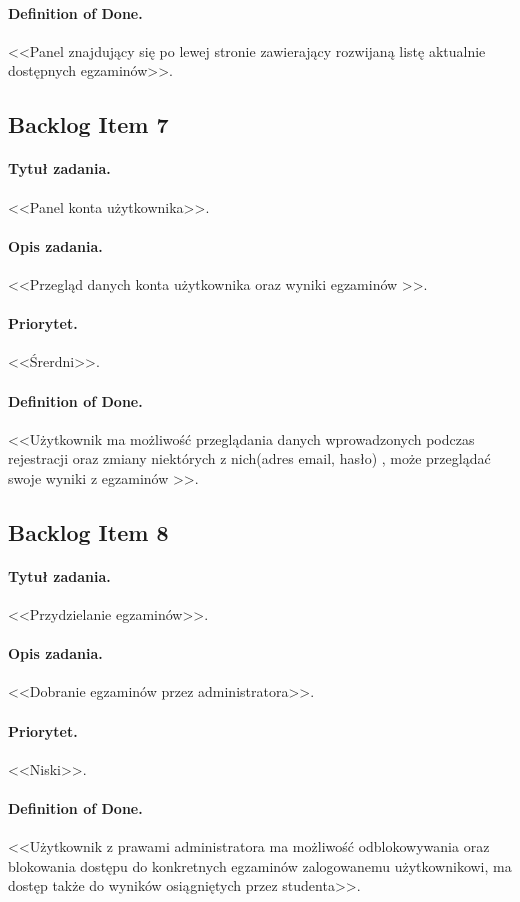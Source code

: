 \documentclass[a4paper]{article}
\begin{document}
\paragraph{Definition of Done.} <<Panel znajdujący się po lewej stronie zawierający rozwijaną listę aktualnie dostępnych egzaminów>>.

\subsection{Backlog Item 7}
\paragraph{Tytuł zadania.} <<Panel konta użytkownika>>.
\paragraph{Opis zadania.} <<Przegląd danych konta użytkownika oraz wyniki egzaminów >>.
\paragraph{Priorytet.} <<Śrerdni>>.
\paragraph{Definition of Done.} <<Użytkownik ma możliwość przeglądania danych wprowadzonych podczas rejestracji oraz zmiany niektórych z nich(adres email, hasło) , może przeglądać swoje wyniki z egzaminów >>.

\subsection{Backlog Item 8}
\paragraph{Tytuł zadania.} <<Przydzielanie egzaminów>>.
\paragraph{Opis zadania.} <<Dobranie egzaminów przez administratora>>.
\paragraph{Priorytet.} <<Niski>>.
\paragraph{Definition of Done.} <<Użytkownik z prawami administratora ma możliwość odblokowywania oraz blokowania dostępu do konkretnych egzaminów zalogowanemu użytkownikowi, ma dostęp także do wyników osiągniętych przez studenta>>.
\end{document}
